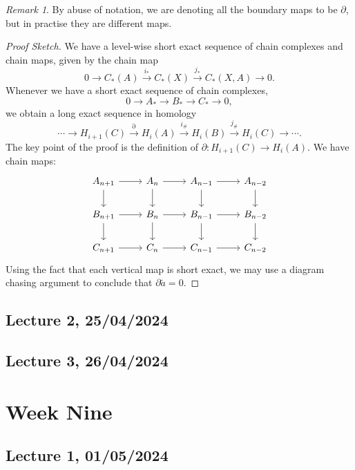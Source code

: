 \documentclass[a4paper]{report}
\theoremstyle{definition}
\theoremstyle{remark}
\newtheorem{remark}{Remark}
\theoremstyle{proposition}
\theoremstyle{conjecture}
\theoremstyle{lemma}
\theoremstyle{corollary}
\theoremstyle{exercise}
\begin{document}
\begin{remark}
    By abuse of notation, we are denoting all the boundary maps to be $\partial$, but in practise they 
    are different maps.
\end{remark}

\begin{proof}[Proof Sketch]
    We have a level-wise short exact sequence of chain complexes and chain maps, given by 
    the chain map 
    $$0 \to C_\ast(A) \stackrel{i_\ast}{\to} C_\ast(X) \stackrel{j_\ast}{\to} C_\ast(X,A) \to 0.$$
    Whenever we have a short exact sequence of chain complexes,  
    $$0 \to A_\ast \to B_\ast \to C_\ast \to 0,$$ we obtain a long exact sequence in homology 
    $$\cdots \to H_{i+1}(C) \stackrel{\partial}{\to} H_i(A) \stackrel{i_\#}{\to} H_i(B) \stackrel{j_\#}{\to} H_i(C) \to \cdots.$$
    The key point of the proof is the definition of $\partial : H_{i+1}(C) \to H_i(A)$.
    We have chain maps:
    $$\begin{tikzcd}
        A_{n+1} \arrow[r] \arrow[d] & A_n \arrow[r] \arrow[d] & A_{n-1} \arrow[r] \arrow[d] & A_{n-2} \arrow[d] \\
        B_{n+1} \arrow[r] \arrow[d] & B_n \arrow[r] \arrow[d] & B_{n-1} \arrow[r] \arrow[d] & B_{n-2} \arrow[d] \\
        C_{n+1} \arrow[r]           & C_n \arrow[r]           & C_{n-1} \arrow[r]           & C_{n-2}          
    \end{tikzcd}$$
    Using the fact that each vertical map is short exact, we may use a diagram chasing argument to conclude that 
    $\partial \widetilde{a} = 0$.
\end{proof}

\section{Lecture 2, 25/04/2024}

\section{Lecture 3, 26/04/2024}

\chapter{Week Nine}

\section{Lecture 1, 01/05/2024}
\end{document}
